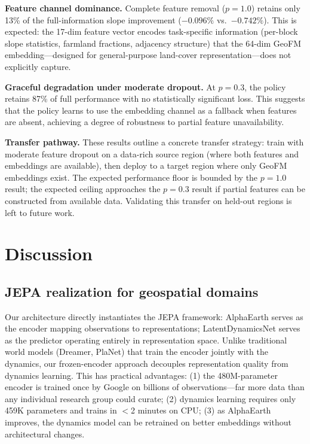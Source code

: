 \documentclass{article}
\begin{document}
\textbf{Feature channel dominance.} Complete feature removal ($p=1.0$) retains only 13\% of the full-information slope improvement ($-0.096\%$ vs.\ $-0.742\%$). This is expected: the 17-dim feature vector encodes task-specific information (per-block slope statistics, farmland fractions, adjacency structure) that the 64-dim GeoFM embedding---designed for general-purpose land-cover representation---does not explicitly capture.

\textbf{Graceful degradation under moderate dropout.} At $p=0.3$, the policy retains 87\% of full performance with no statistically significant loss. This suggests that the policy learns to use the embedding channel as a fallback when features are absent, achieving a degree of robustness to partial feature unavailability.

\textbf{Transfer pathway.} These results outline a concrete transfer strategy: train with moderate feature dropout on a data-rich source region (where both features and embeddings are available), then deploy to a target region where only GeoFM embeddings exist. The expected performance floor is bounded by the $p=1.0$ result; the expected ceiling approaches the $p=0.3$ result if partial features can be constructed from available data. Validating this transfer on held-out regions is left to future work.



\section{Discussion}
\label{sec:discussion}

\subsection{JEPA realization for geospatial domains}

Our architecture directly instantiates the JEPA framework: AlphaEarth serves as the encoder mapping observations to representations; LatentDynamicsNet serves as the predictor operating entirely in representation space. Unlike traditional world models (Dreamer, PlaNet) that train the encoder jointly with the dynamics, our frozen-encoder approach decouples representation quality from dynamics learning. This has practical advantages: (1) the 480M-parameter encoder is trained once by Google on billions of observations---far more data than any individual research group could curate; (2) dynamics learning requires only 459K parameters and trains in $<$2 minutes on CPU; (3) as AlphaEarth improves, the dynamics model can be retrained on better embeddings without architectural changes.
\end{document}
